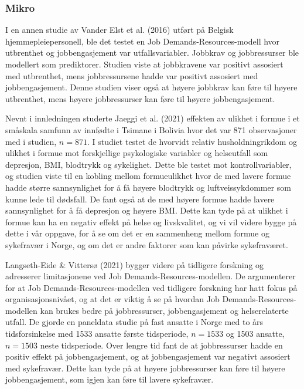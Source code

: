 \documentclass[
  12pt,
  a4paper,
  DIV=11,
  numbers=noendperiod]{scrartcl}
\begin{document}
\subsubsection{Mikro}\label{mikro}

I en annen studie av Vander Elst et al. (2016) utført på Belgisk
hjemmepleiepersonell, ble det testet en Job Demands-Resources-modell
hvor utbrenthet og jobbengasjement var utfallsvariabler. Jobbkrav og
jobbressurser ble modellert som prediktorer. Studien viste at
jobbkravene var positivt assosiert med utbrenthet, mens jobbressursene
hadde var positivt assosiert med jobbengasjement. Denne studien viser
også at høyere jobbkrav kan føre til høyere utbrenthet, mens høyere
jobbressurser kan føre til høyere jobbengasjement.

Nevnt i innledningen studerte Jaeggi et al. (2021) effekten av ulikhet i
formue i et småskala samfunn av innfødte i Tsimane i Bolivia hvor det
var 871 observasjoner med i studien, \(n = 871\). I studiet testet de
hvorvidt relativ husholdningrikdom og ulikhet i formue mot forskjellige
psykologiske variabler og helseutfall som depresjon, BMI, blodtrykk og
sykelighet. Dette ble testet mot kontrollvariabler, og studien viste til
en kobling mellom formueulikhet hvor de med lavere formue hadde større
sannsynlighet for å få høyere blodtrykk og luftveissykdommer som kunne
lede til dødsfall. De fant også at de med høyere formue hadde lavere
sannsynlighet for å få depresjon og høyere BMI. Dette kan tyde på at
ulikhet i formue kan ha en negativ effekt på helse og livskvalitet, og
vi vil videre bygge på dette i vår oppgave, for å se om det er en
sammenheng mellom formue og sykefravær i Norge, og om det er andre
faktorer som kan påvirke sykefraværet.

Langseth-Eide \& Vittersø (2021) bygger videre på tidligere forskning og
adresserer limitasjonene ved Job Demands-Resources-modellen. De
argumenterer for at Job Demands-Resources-modellen ved tidligere
forskning har hatt fokus på organisasjonsnivået, og at det er viktig å
se på hvordan Job Demands-Resources-modellen kan brukes bedre på
jobbressurser, jobbengasjement og helserelaterte utfall. De gjorde en
paneldata studie på fast ansatte i Norge med to års tidsforsinkelse med
1533 ansatte første tidsperiode, \(n =1533\) og 1503 ansatte,
\(n = 1503\) neste tidsperiode. Over lengre tid fant de at jobbressurser
hadde en positiv effekt på jobbengasjement, og at jobbengasjement var
negativt assosiert med sykefravær. Dette kan tyde på at høyere
jobbressurser kan føre til høyere jobbengasjement, som igjen kan føre
til lavere sykefravær.
\end{document}
